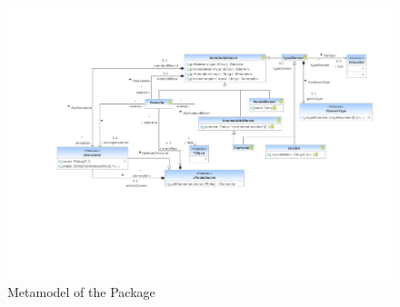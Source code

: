 %
%

\begin{figure}[htbp]
  \centering
  \includegraphics[width=\textheight,angle=90]{figures/A_technical-reference/packages/modeling/sdm-core}
  \caption{Metamodel of the  Package}
  \label{fig:MM:modeling}
\end{figure}
